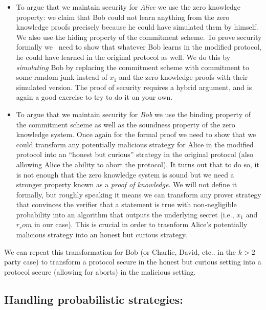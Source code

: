 \begin{itemize}
\item
  To argue that we maintain security for \emph{Alice} we use the zero
  knowledge property: we claim that Bob could not learn anything from
  the zero knowledge proofs precisely because he could have simulated
  them by himself. We also use the hiding property of the commitment
  scheme. To prove security formally we ~need to show that whatever Bob
  learns in the modified protocol, he could have learned in the original
  protocol as well. We do this by \emph{simulating} Bob by replacing the
  commitment scheme with commitment to some random junk instead of
  \(x_1\) and the zero knowledge proofs with their simulated version.
  The proof of security requires a hybrid argument, and is again a good
  exercise to try to do it on your own.
\item
  To argue that we maintain security for \emph{Bob} we use the binding
  property of the commitment scheme as well as the soundness property of
  the zero knowledge system. Once again for the formal proof we need to
  show that we could transform any potentially malicious strategy for
  Alice in the modified protocol into an ``honest but curious'' strategy
  in the original protocol (also allowing Alice the ability to abort the
  protocol). It turns out that to do so, it is not enough that the zero
  knowledge system is sound but we need a stronger property known as a
  \emph{proof of knowledge}. We will not define it formally, but roughly
  speaking it means we can transform any prover strategy that convinces
  the verifier that a statement is true with non-negligible probability
  into an algorithm that outputs the underlying secret (i.e., \(x_1\)
  and \(r_com\) in our case). This is crucial in order to trasnform
  Alice's potentially malicious strategy into an honest but curious
  strategy.
\end{itemize}

We can repeat this transformation for Bob (or Charlie, David, etc.. in
the \(k>2\) party case) to transform a protocol secure in the honest but
curious setting into a protocol secure (allowing for aborts) in the
malicious setting.

\subsection{Handling probabilistic
strategies:}\label{Handling-probabilistic-st}

